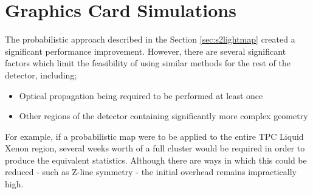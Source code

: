 \section{Graphics Card Simulations}

\par
The probabilistic approach described in the Section \ref{sec:s2lightmap} created a significant performance improvement. 
However, there are several significant factors which limit the feasibility of using similar methods for the rest of the detector, including;
\begin{itemize}
    \item Optical propagation being required to be performed at least once
    \item Other regions of the detector containing significantly more complex geometry
\end{itemize}
For example, if a probabilistic map were to be applied to the entire TPC Liquid Xenon region, several weeks worth of a full cluster would be required in order to produce the equivalent statistics.
Although there are ways in which this could be reduced - such as Z-line symmetry - the initial overhead remains impractically high.

